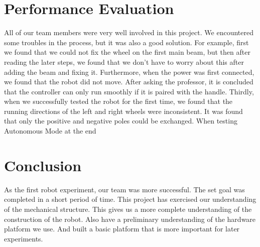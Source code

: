 \documentclass[12pt]{report}
\begin{document}
\section{Performance Evaluation }
All of our team members were very well involved in this project. We encountered some troubles in the process, but it was also a good solution. For example, first we found that we could not fix the wheel on the first main beam, but then after reading the later steps, we found that we don't have to worry about this after adding the beam and fixing it. Furthermore, when the power was first connected, we found that the robot did not move. After asking the professor, it is concluded that the controller can only run smoothly if it is paired with the handle. Thirdly, when we successfully tested the robot for the first time, we found that the running directions of the left and right wheels were inconsistent. It was found that only the positive and negative poles could be exchanged. When testing Autonomous Mode at the end

\section{Conclusion}

As the first robot experiment, our team was more successful. The set goal was completed in a short period of time. This project has exercised our understanding of the mechanical structure. This gives us a more complete understanding of the construction of the robot. Also have a preliminary understanding of the hardware platform we use. And built a basic platform that is more important for later experiments.
\end{document}

